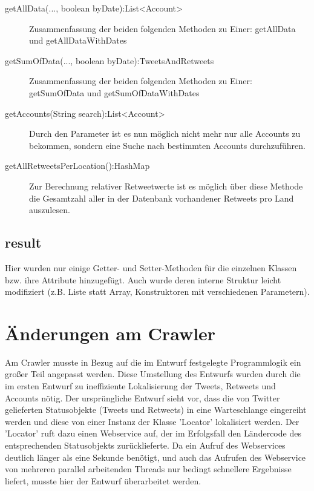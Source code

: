 \begin{itemize}
\begin{description}
		\item[getAllData(..., boolean byDate):List<Account>] Zusammenfassung der beiden folgenden Methoden zu Einer: getAllData und getAllDataWithDates
		\item[getSumOfData(..., boolean byDate):TweetsAndRetweets] Zusammenfassung der beiden folgenden Methoden zu Einer: getSumOfData und getSumOfDataWithDates
		\item[getAccounts(String search):List<Account>] Durch den Parameter ist es nun möglich nicht mehr nur alle Accounts zu bekommen, sondern eine Suche nach bestimmten Accounts durchzuführen.
		\item[getAllRetweetsPerLocation():HashMap] Zur Berechnung relativer Retweetwerte ist es möglich über diese Methode die Gesamtzahl aller in der Datenbank vorhandener Retweets pro Land auszulesen.
	\end{description}
\end{itemize}
	
\subsection{result}
Hier wurden nur einige Getter- und Setter-Methoden für die einzelnen Klassen bzw. ihre Attribute hinzugefügt. Auch wurde deren interne Struktur leicht modifiziert (z.B. Liste statt Array, Konstruktoren mit verschiedenen Parametern).

\section{Änderungen am Crawler}
Am Crawler musste in Bezug auf die im Entwurf festgelegte Programmlogik ein großer Teil angepasst werden. Diese Umstellung des Entwurfs wurden durch die im ersten Entwurf zu ineffiziente Lokalisierung der Tweets, Retweets und Accounts nötig. Der ursprüngliche Entwurf sieht vor, dass die von Twitter gelieferten Statusobjekte (Tweets und Retweets) in eine Warteschlange eingereiht werden und diese von einer Instanz der Klasse 'Locator' lokalisiert werden. Der 'Locator' ruft dazu einen Webservice auf, der im Erfolgsfall den Ländercode des entsprechenden Statusobjekts zurücklieferte. Da ein Aufruf des Webservices deutlich länger als eine Sekunde benötigt, und auch das Aufrufen des Webservice von mehreren parallel arbeitenden Threads nur bedingt schnellere Ergebnisse liefert, musste hier der Entwurf überarbeitet werden.

